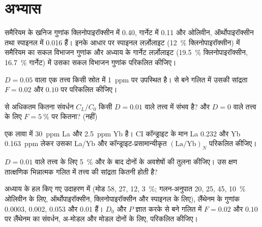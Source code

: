 \section{अभ्यास}

\begin{exercise}[$\star$]\label{exo:b3:trace-element-modelling:1}
समैरियम के खनिज गुणांक क्लिनोपाइरॉक्सीन में 0.40,
गार्नेट में 0.11 और ओलिवीन, ऑर्थोपाइरॉक्सीन तथा स्पाइनल में 0.016 हैं। इनके आधार पर
स्पाइनल लर्ज़ोलाइट (\qty{12}{\percent} क्लिनोपाइरॉक्सीन) में समैरियम का सकल विभाजन गुणांक
और अध्याय के गार्नेट लर्ज़ोलाइट (\qty{19.5}{\percent} क्लिनोपाइरॉक्सीन,
\qty{16.7}{\percent} गार्नेट) में उसका सकल विभाजन गुणांक परिकलित कीजिए।
\end{exercise}

\begin{exercise}[$\star$]\label{exo:b3:trace-element-modelling:2}
$D = 0.05$ वाला एक तत्त्व किसी स्रोत में \qty{1}{ppm} पर उपस्थित है।
 से बने गलित में उसकी सांद्रता $F = 0.02$ और $0.10$ पर परिकलित कीजिए।
\end{exercise}

\begin{exercise}[$\star$]\label{exo:b3:trace-element-modelling:3}
 से अधिकतम कितना संवर्धन $C_L/C_0$ किसी $D = 0.01$ वाले
तत्त्व में संभव है? और $D = 0$ वाले तत्त्व के लिए $F = \qty{5}{\percent}$ पर कितना?
(नहीं)
\end{exercise}

\begin{exercise}[$\star$]\label{exo:b3:trace-element-modelling:4}
एक लावा में \qty{30}{ppm} La और \qty{2.5}{ppm} Yb है। CI कॉन्ड्राइट के मान
La 0.232 और Yb \qty{0.163}{ppm} लेकर उसका La/Yb और कॉन्ड्राइट-प्रसामान्यीकृत
$(\mathrm{La}/\mathrm{Yb})_N$ परिकलित कीजिए।
\end{exercise}

\begin{exercise}[$\star\star$]\label{exo:b3:trace-element-modelling:5}
$D = 0.01$ वाले तत्त्व के लिए \qty{5}{\percent}  और  के बाद
दोनों के अवशेषों की तुलना कीजिए। उस क्षण तात्क्षणिक भिन्नात्मक गलित में
तत्त्व की सांद्रता कितनी होती है?
\end{exercise}

\begin{exercise}[$\star\star$]\label{exo:b3:trace-element-modelling:6}
अध्याय के हल किए गए उदाहरण में (मोड 58, 27, 12, \qty{3}{\percent};
गलन-अनुपात 20, 25, 45, \qty{10}{\percent} ओलिवीन के लिए,
ऑर्थोपाइरॉक्सीन, क्लिनोपाइरॉक्सीन और स्पाइनल के लिए), लैंथेनम के गुणांक
0.0003, 0.002, 0.053 और 0.01 हैं। $D_0$ और $P$ ज्ञात करके
 से बने गलित में $F = 0.02$ और $0.10$ पर लैंथेनम का संवर्धन, अ-मोडल और मोडल दोनों के लिए, परिकलित कीजिए।
\end{exercise}

